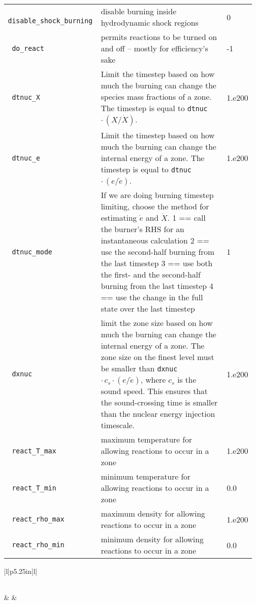 \begin{landscape}
{\begin{center}
\begin{longtable}{|l|p{5.25in}|l|}
\rowcolor{tableShade}
\verb= disable_shock_burning = &  disable burning inside hydrodynamic shock regions & 0 \\
\verb= do_react = &  permits reactions to be turned on and off -- mostly for efficiency's sake & -1 \\
\rowcolor{tableShade}
\verb= dtnuc_X = &  Limit the timestep based on how much the burning can change the species mass fractions of a zone. The timestep is equal to {\tt dtnuc}  $\cdot\,(X / \dot{X})$. & 1.e200 \\
\verb= dtnuc_e = &  Limit the timestep based on how much the burning can change the internal energy of a zone. The timestep is equal to {\tt dtnuc}  $\cdot\,(e / \dot{e})$. & 1.e200 \\
\rowcolor{tableShade}
\verb= dtnuc_mode = &  If we are doing burning timestep limiting, choose the method for estimating $\dot{e}$ and $\dot{X}$. 1 == call the burner's RHS for an instantaneous calculation 2 == use the second-half burning from the last timestep 3 == use both the first- and the second-half burning from the last timestep 4 == use the change in the full state over the last timestep & 1 \\
\verb= dxnuc = &  limit the zone size based on how much the burning can change the internal energy of a zone. The zone size on the finest level must be smaller than {\tt dxnuc} $\cdot\, c_s\cdot (e / \dot{e})$, where $c_s$ is the sound speed. This ensures that the sound-crossing time is smaller than the nuclear energy injection timescale. & 1.e200 \\
\rowcolor{tableShade}
\verb= react_T_max = &  maximum temperature for allowing reactions to occur in a zone & 1.e200 \\
\verb= react_T_min = &  minimum temperature for allowing reactions to occur in a zone & 0.0 \\
\rowcolor{tableShade}
\verb= react_rho_max = &  maximum density for allowing reactions to occur in a zone & 1.e200 \\
\verb= react_rho_min = &  minimum density for allowing reactions to occur in a zone & 0.0 \\


\end{longtable}
\end{center}

} %


{\small

\renewcommand{\arraystretch}{1.5}
%
\begin{center}
\begin{longtable}{|l|p{5.25in}|l|}
\caption[ refinement
 parameters.]{ refinement
 parameters.} \label{table:  refinement
 parameters. runtime} \\
%
\hline {} & 
        & 
        \\ \hline 
\endfirsthead


\end{longtable}
\end{center}}
\end{landscape}
